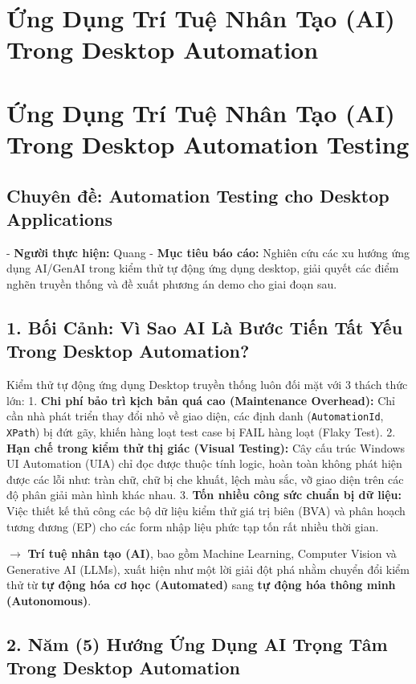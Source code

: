 \section{Ứng Dụng Trí Tuệ Nhân Tạo (AI) Trong Desktop Automation}

\section{Ứng Dụng Trí Tuệ Nhân Tạo (AI) Trong Desktop Automation Testing}
\subsection{Chuyên đề: Automation Testing cho Desktop Applications}

- \textbf{Người thực hiện:} Quang 
- \textbf{Mục tiêu báo cáo:} Nghiên cứu các xu hướng ứng dụng AI/GenAI trong kiểm thử tự động ứng dụng desktop, giải quyết các điểm nghẽn truyền thống và đề xuất phương án demo cho giai đoạn sau.


\subsection{1. Bối Cảnh: Vì Sao AI Là Bước Tiến Tất Yếu Trong Desktop Automation?}

Kiểm thử tự động ứng dụng Desktop truyền thống luôn đối mặt với 3 thách thức lớn:
1. \textbf{Chi phí bảo trì kịch bản quá cao (Maintenance Overhead):} Chỉ cần nhà phát triển thay đổi nhỏ về giao diện, các định danh (\texttt{AutomationId}, \texttt{XPath}) bị đứt gãy, khiến hàng loạt test case bị FAIL hàng loạt (Flaky Test).
2. \textbf{Hạn chế trong kiểm thử thị giác (Visual Testing):} Cây cấu trúc Windows UI Automation (UIA) chỉ đọc được thuộc tính logic, hoàn toàn không phát hiện được các lỗi như: tràn chữ, chữ bị che khuất, lệch màu sắc, vỡ giao diện trên các độ phân giải màn hình khác nhau.
3. \textbf{Tốn nhiều công sức chuẩn bị dữ liệu:} Việc thiết kế thủ công các bộ dữ liệu kiểm thử giá trị biên (BVA) và phân hoạch tương đương (EP) cho các form nhập liệu phức tạp tốn rất nhiều thời gian.

$\longrightarrow$ \textbf{Trí tuệ nhân tạo (AI)}, bao gồm Machine Learning, Computer Vision và Generative AI (LLMs), xuất hiện như một lời giải đột phá nhằm chuyển đổi kiểm thử từ \textbf{tự động hóa cơ học (Automated)} sang \textbf{tự động hóa thông minh (Autonomous)}.


\subsection{2. Năm (5) Hướng Ứng Dụng AI Trọng Tâm Trong Desktop Automation}

